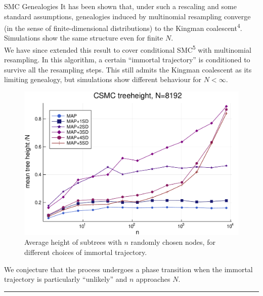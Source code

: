 \documentclass[final, 12pt]{beamer}
\newlength{\colwidth}
\begin{document}
\begin{frame}
\begin{columns}
\begin{column}{\colwidth}
\begin{block}{SMC Genealogies}
It has been shown that, under such a rescaling and some standard assumptions, genealogies induced by multinomial resampling converge (in the sense of finite-dimensional distributions) to the Kingman coalescent\textsuperscript{4}. Simulations show the same structure even for finite $N$.\\[16pt]

We have since extended this result to cover conditional SMC\textsuperscript{5} with multinomial resampling. In this algorithm, a certain ``immortal trajectory'' is conditioned to survive all the resampling steps. This still admits the Kingman coalescent as its limiting genealogy, but simulations show different behaviour for $N<\infty$.\\[35pt]
\begin{figure}
\includegraphics[width=\colwidth]{../CSMC_treeheight_500reps.pdf}
\caption{Average height of subtrees with $n$ randomly chosen nodes, for different choices of immortal trajectory.}
\end{figure}
We conjecture that the process undergoes a phase transition when the immortal trajectory is particularly ``unlikely'' and $n$ approaches $N$.
\end{block}

\vspace*{40pt}
\hrule
\begin{block}

\vspace*{-20pt}


\end{block}
\end{column}
\end{columns}
\end{frame}
\end{document}
